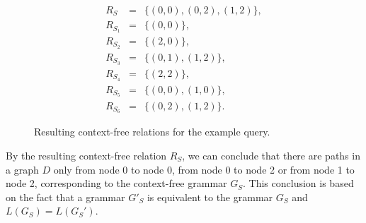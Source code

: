 \begin{figure}[h]
\begin{eqnarray*}
R_S&=&\{(0,0),(0,2),(1,2)\},\\
R_{S_1}&=&\{(0,0)\},\\
R_{S_2}&=&\{(2,0)\}, \\
R_{S_3}&=&\{(0,1), (1,2)\}, \\
R_{S_4}&=&\{(2,2)\}, \\
R_{S_5}&=&\{(0,0), (1,0)\}, \\
R_{S_6}&=&\{(0,2), (1,2)\}.
\end{eqnarray*}
\caption{Resulting context-free relations for the example query.}
\label{ExampleQueryCFRelations}
\end{figure}

By the resulting context-free relation $R_S$, we can conclude that there are paths in a graph $D$ only from node 0 to node 0, from node 0 to node 2 or from node 1 to node 2, corresponding to the context-free grammar $G_S$. This conclusion is based on the fact that a grammar $G'_S$ is equivalent to the grammar $G_S$ and $L(G_S) = L(G_S')$.